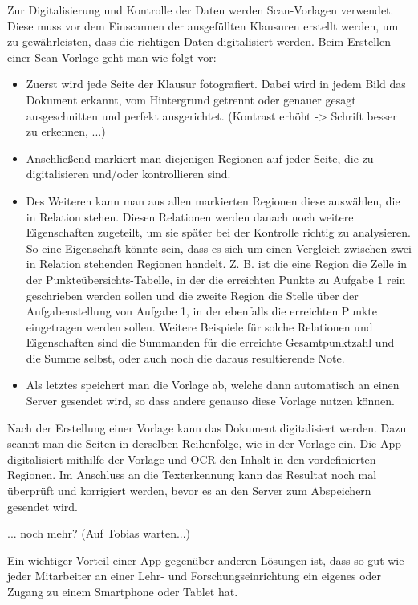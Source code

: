 \documentclass[nomenclature, 150]{HSMW-Thesis}
\begin{document}
	Zur Digitalisierung und Kontrolle der Daten werden Scan-Vorlagen verwendet. Diese muss vor dem Einscannen der ausgefüllten Klausuren erstellt werden, um zu gewährleisten, dass die richtigen Daten digitalisiert werden. Beim Erstellen einer Scan-Vorlage geht man wie folgt vor:
	\begin{itemize}
		\item Zuerst wird jede Seite der Klausur fotografiert. Dabei wird in jedem Bild das Dokument erkannt, vom Hintergrund getrennt oder genauer gesagt ausgeschnitten und perfekt ausgerichtet. (Kontrast erhöht -> Schrift besser zu erkennen, ...) 
		\item Anschließend markiert man diejenigen Regionen auf jeder Seite, die zu digitalisieren und/oder kontrollieren sind.
		\item Des Weiteren kann man aus allen markierten Regionen diese auswählen, die in Relation stehen. Diesen Relationen werden danach noch weitere Eigenschaften zugeteilt, um sie später bei der Kontrolle richtig zu analysieren. So eine Eigenschaft könnte sein, dass es sich um einen Vergleich zwischen zwei in Relation stehenden Regionen handelt. Z. B. ist die eine Region die Zelle in der Punkteübersichts-Tabelle, in der die erreichten Punkte zu Aufgabe 1 rein geschrieben werden sollen und die zweite Region die Stelle über der Aufgabenstellung von Aufgabe 1, in der ebenfalls die erreichten Punkte eingetragen werden sollen. Weitere Beispiele für solche Relationen und Eigenschaften sind die Summanden für die erreichte Gesamtpunktzahl und die Summe selbst, oder auch noch die daraus resultierende Note.
		\item Als letztes speichert man die Vorlage ab, welche dann automatisch an einen Server gesendet wird, so dass andere genauso diese Vorlage nutzen können.
	\end{itemize}
	
	Nach der Erstellung einer Vorlage kann das Dokument digitalisiert werden. Dazu scannt man die Seiten in derselben Reihenfolge, wie in der Vorlage ein. Die App digitalisiert mithilfe der Vorlage und OCR den Inhalt in den vordefinierten Regionen. Im Anschluss an die Texterkennung kann das Resultat noch mal überprüft und korrigiert werden, bevor es an den Server zum Abspeichern gesendet wird.
	
	... noch mehr? (Auf Tobias warten...)
	
	Ein wichtiger Vorteil einer App gegenüber anderen Lösungen ist, dass so gut wie jeder Mitarbeiter an einer Lehr- und Forschungseinrichtung ein eigenes oder Zugang zu einem Smartphone oder Tablet hat.
\end{document}
